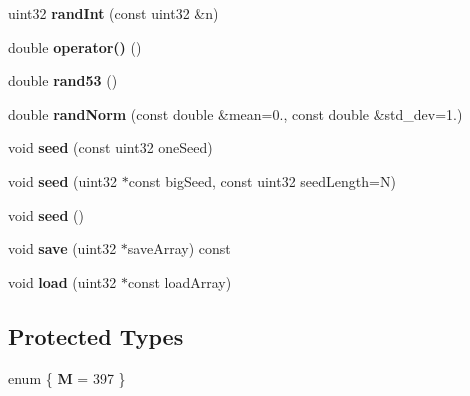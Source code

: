\begin{DoxyCompactItemize}
\item 
\hypertarget{classelpm_1_1_m_t_rand_a445bfec51e78587fa449791d2114b2a7}{uint32 {\bfseries rand\+Int} (const uint32 \&n)}\label{classelpm_1_1_m_t_rand_a445bfec51e78587fa449791d2114b2a7}

\item 
\hypertarget{classelpm_1_1_m_t_rand_ae2f22db8f99a8789799c104849dfc41c}{double {\bfseries operator()} ()}\label{classelpm_1_1_m_t_rand_ae2f22db8f99a8789799c104849dfc41c}

\item 
\hypertarget{classelpm_1_1_m_t_rand_a2373b159fd226939f05a22ffba92a3eb}{double {\bfseries rand53} ()}\label{classelpm_1_1_m_t_rand_a2373b159fd226939f05a22ffba92a3eb}

\item 
\hypertarget{classelpm_1_1_m_t_rand_a10b786b6118a3e148332de6f88abd7ab}{double {\bfseries rand\+Norm} (const double \&mean=0., const double \&std\+\_\+dev=1.)}\label{classelpm_1_1_m_t_rand_a10b786b6118a3e148332de6f88abd7ab}

\item 
\hypertarget{classelpm_1_1_m_t_rand_a8672fa331a96b57bf22dc0a1b3cfa26a}{void {\bfseries seed} (const uint32 one\+Seed)}\label{classelpm_1_1_m_t_rand_a8672fa331a96b57bf22dc0a1b3cfa26a}

\item 
\hypertarget{classelpm_1_1_m_t_rand_a652fb3f18f72b8b35e50d3e931a3d099}{void {\bfseries seed} (uint32 $\ast$const big\+Seed, const uint32 seed\+Length=N)}\label{classelpm_1_1_m_t_rand_a652fb3f18f72b8b35e50d3e931a3d099}

\item 
\hypertarget{classelpm_1_1_m_t_rand_a120c68e7ee536ea887d5c70a4f965431}{void {\bfseries seed} ()}\label{classelpm_1_1_m_t_rand_a120c68e7ee536ea887d5c70a4f965431}

\item 
\hypertarget{classelpm_1_1_m_t_rand_ae04c368224aa2ecb3285122056f4d4e0}{void {\bfseries save} (uint32 $\ast$save\+Array) const }\label{classelpm_1_1_m_t_rand_ae04c368224aa2ecb3285122056f4d4e0}

\item 
\hypertarget{classelpm_1_1_m_t_rand_a5ee75b8a350ae9a578a72fe8064b7241}{void {\bfseries load} (uint32 $\ast$const load\+Array)}\label{classelpm_1_1_m_t_rand_a5ee75b8a350ae9a578a72fe8064b7241}

\end{DoxyCompactItemize}
\subsection*{Protected Types}
\begin{DoxyCompactItemize}
\item 
\hypertarget{classelpm_1_1_m_t_rand_a2082f5b8970689fecc07c81b35a2d47b}{enum \{ {\bfseries M} = 397
 \}}\label{classelpm_1_1_m_t_rand_a2082f5b8970689fecc07c81b35a2d47b}

\end{DoxyCompactItemize}
